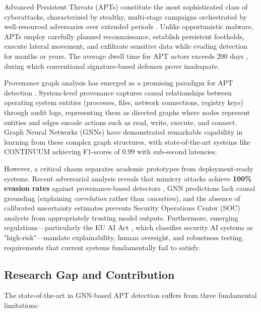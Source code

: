\documentclass[conference]{IEEEtran}
\begin{document}
Advanced Persistent Threats (APTs) constitute the most sophisticated class of cyberattacks, characterized by stealthy, multi-stage campaigns orchestrated by well-resourced adversaries over extended periods \cite{apt_taxonomy}. Unlike opportunistic malware, APTs employ carefully planned reconnaissance, establish persistent footholds, execute lateral movement, and exfiltrate sensitive data while evading detection for months or years. The average dwell time for APT actors exceeds 200 days \cite{mandiant_report}, during which conventional signature-based defenses prove inadequate.

Provenance graph analysis has emerged as a promising paradigm for APT detection \cite{nodoze,streamspot}. System-level provenance captures causal relationships between operating system entities (processes, files, network connections, registry keys) through audit logs, representing them as directed graphs where nodes represent entities and edges encode actions such as read, write, execute, and connect. Graph Neural Networks (GNNs) have demonstrated remarkable capability in learning from these complex graph structures, with state-of-the-art systems like CONTINUUM \cite{continuum} achieving F1-scores of 0.99 with sub-second latencies.

However, a critical chasm separates academic prototypes from deployment-ready systems. Recent adversarial analysis reveals that mimicry attacks achieve \textbf{100\% evasion rates} against provenance-based detectors \cite{mimicry_ndss}, GNN predictions lack causal grounding (explaining \emph{correlation} rather than \emph{causation}), and the absence of calibrated uncertainty estimates prevents Security Operations Center (SOC) analysts from appropriately trusting model outputs. Furthermore, emerging regulations—particularly the EU AI Act \cite{eu_ai_act}, which classifies security AI systems as "high-risk"—mandate explainability, human oversight, and robustness testing, requirements that current systems fundamentally fail to satisfy.

\subsection{Research Gap and Contribution}

The state-of-the-art in GNN-based APT detection suffers from three fundamental limitations:
\end{document}
